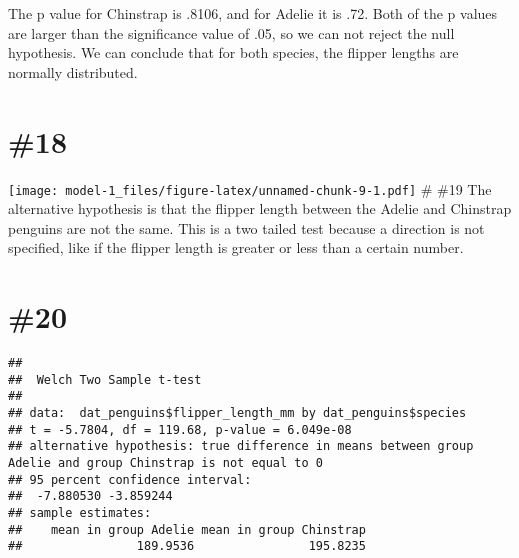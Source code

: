 \documentclass[
]{article}
\newenvironment{Shaded}{\begin{snugshade}}{\end{snugshade}}
\newcommand{\AttributeTok}[1]{\textcolor[rgb]{0.77,0.63,0.00}{#1}}
\newcommand{\DecValTok}[1]{\textcolor[rgb]{0.00,0.00,0.81}{#1}}
\newcommand{\FunctionTok}[1]{\textcolor[rgb]{0.00,0.00,0.00}{#1}}
\newcommand{\NormalTok}[1]{#1}
\newcommand{\SpecialCharTok}[1]{\textcolor[rgb]{0.00,0.00,0.00}{#1}}
\newcommand{\StringTok}[1]{\textcolor[rgb]{0.31,0.60,0.02}{#1}}
\begin{document}
The p value for Chinstrap is .8106, and for Adelie it is .72. Both of
the p values are larger than the significance value of .05, so we can
not reject the null hypothesis. We can conclude that for both species,
the flipper lengths are normally distributed.

\hypertarget{section-17}{%
\section{\#18}\label{section-17}}

\begin{Shaded}
\end{Shaded}

\texttt{[image: model-1\_files/figure-latex/unnamed-chunk-9-1.pdf]} \#
\#19 The alternative hypothesis is that the flipper length between the
Adelie and Chinstrap penguins are not the same. This is a two tailed
test because a direction is not specified, like if the flipper length is
greater or less than a certain number.

\hypertarget{section-18}{%
\section{\#20}\label{section-18}}

\begin{Shaded}
\end{Shaded}

\begin{verbatim}
## 
##  Welch Two Sample t-test
## 
## data:  dat_penguins$flipper_length_mm by dat_penguins$species
## t = -5.7804, df = 119.68, p-value = 6.049e-08
## alternative hypothesis: true difference in means between group Adelie and group Chinstrap is not equal to 0
## 95 percent confidence interval:
##  -7.880530 -3.859244
## sample estimates:
##    mean in group Adelie mean in group Chinstrap 
##                189.9536                195.8235
\end{verbatim}
\end{document}
